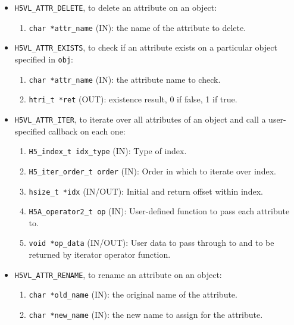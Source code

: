 \begin{itemize}
\item \texttt{H5VL\_ATTR\_DELETE}, to delete an attribute on an object:
  \begin{enumerate}
  \item \texttt{char *attr\_name} (IN): the name of the attribute to delete.
  \end{enumerate}

\item \texttt{H5VL\_ATTR\_EXISTS}, to check if an attribute exists on a
  particular object specified in \texttt{obj}:
  \begin{enumerate}
  \item \texttt{char *attr\_name} (IN): the attribute name to check.
  \item \texttt{htri\_t *ret} (OUT): existence result, 0 if false, 1 if true.
  \end{enumerate}

\item \texttt{H5VL\_ATTR\_ITER}, to iterate over all attributes of an object and call a user-specified callback on each one:
  \begin{enumerate}
  \item \texttt{H5\_index\_t idx\_type} (IN): Type of index.\\
  \item \texttt{H5\_iter\_order\_t order} (IN): Order in which to iterate over index.\\
  \item \texttt{hsize\_t *idx} (IN/OUT): Initial and return offset within index.\\
  \item \texttt{H5A\_operator2\_t op} (IN): User-defined function to pass each attribute to. \\
  \item \texttt{void *op\_data} (IN/OUT): User data to pass through to and to be returned by iterator operator function. \\
  \end{enumerate}

\item \texttt{H5VL\_ATTR\_RENAME}, to rename an attribute on an object:
  \begin{enumerate}
  \item \texttt{char *old\_name} (IN): the original name of the attribute.
  \item \texttt{char *new\_name} (IN): the new name to assign for the attribute.
  \end{enumerate}

\end{itemize}

